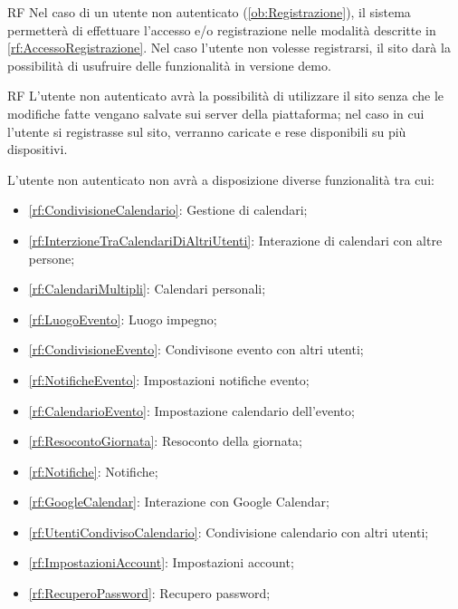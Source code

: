 \begin{listaPersonale}{RF}
	 Nel caso di un utente non autenticato (\ref{ob:Registrazione}), il sistema permetterà di effettuare l'accesso e/o registrazione nelle modalità descritte in \ref{rf:AccessoRegistrazione}. Nel caso l'utente non volesse registrarsi, il sito darà la possibilità di usufruire delle funzionalità in versione demo.
	\begin{listaPersonale2}{RF}
		 L'utente non autenticato avrà la possibilità di utilizzare il sito senza che le modifiche fatte vengano salvate sui server della piattaforma; nel caso in cui l'utente si registrasse sul sito, verranno caricate e rese disponibili su più dispositivi.
		\begin{listaPersonale3}[RF]{}
			 L'utente non autenticato non avrà a disposizione diverse funzionalità tra cui:
			\begin{itemize}
				\item \ref{rf:CondivisioneCalendario}: Gestione di calendari;
				\item \ref{rf:InterzioneTraCalendariDiAltriUtenti}: Interazione di calendari con altre persone;
				\item \ref{rf:CalendariMultipli}: Calendari personali;
				\item \ref{rf:LuogoEvento}: Luogo impegno;
				\item \ref{rf:CondivisioneEvento}: Condivisone evento con altri utenti;
				\item \ref{rf:NotificheEvento}: Impostazioni notifiche evento;
				\item \ref{rf:CalendarioEvento}: Impostazione calendario dell'evento;
				\item \ref{rf:ResocontoGiornata}: Resoconto della giornata;
				\item \ref{rf:Notifiche}: Notifiche;
				\item \ref{rf:GoogleCalendar}: Interazione con Google Calendar;
				\item \ref{rf:UtentiCondivisoCalendario}: Condivisione calendario con altri utenti;
				\item \ref{rf:ImpostazioniAccount}: Impostazioni account;
				\item \ref{rf:RecuperoPassword}: Recupero password;
			\end{itemize}
		\end{listaPersonale3}
	\end{listaPersonale2}


\end{listaPersonale}
